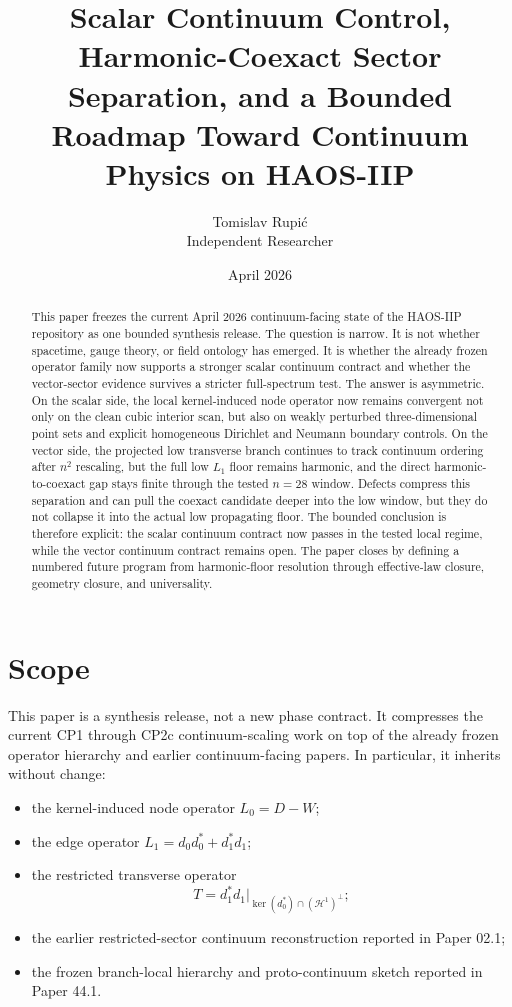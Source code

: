 \documentclass[11pt]{article}
\title{Scalar Continuum Control, Harmonic-Coexact Sector Separation, and a Bounded Roadmap Toward Continuum Physics on HAOS-IIP}
\author{Tomislav Rupi\'c \\ Independent Researcher}
\date{April 2026}
\begin{document}
\maketitle

\begin{abstract}
This paper freezes the current April 2026 continuum-facing state of the HAOS-IIP repository as one bounded synthesis release. The question is narrow. It is not whether spacetime, gauge theory, or field ontology has emerged. It is whether the already frozen operator family now supports a stronger scalar continuum contract and whether the vector-sector evidence survives a stricter full-spectrum test. The answer is asymmetric. On the scalar side, the local kernel-induced node operator now remains convergent not only on the clean cubic interior scan, but also on weakly perturbed three-dimensional point sets and explicit homogeneous Dirichlet and Neumann boundary controls. On the vector side, the projected low transverse branch continues to track continuum ordering after $n^2$ rescaling, but the full low $L_1$ floor remains harmonic, and the direct harmonic-to-coexact gap stays finite through the tested $n=28$ window. Defects compress this separation and can pull the coexact candidate deeper into the low window, but they do not collapse it into the actual low propagating floor. The bounded conclusion is therefore explicit: the scalar continuum contract now passes in the tested local regime, while the vector continuum contract remains open. The paper closes by defining a numbered future program from harmonic-floor resolution through effective-law closure, geometry closure, and universality.
\end{abstract}

\section{Scope}

This paper is a synthesis release, not a new phase contract. It compresses the current CP1 through CP2c continuum-scaling work on top of the already frozen operator hierarchy and earlier continuum-facing papers. In particular, it inherits without change:
\begin{itemize}
\item the kernel-induced node operator $L_0 = D-W$;
\item the edge operator $L_1 = d_0 d_0^* + d_1^* d_1$;
\item the restricted transverse operator
\[
T = d_1^* d_1 \big|_{\ker(d_0^*) \cap (\mathcal{H}^1)^\perp};
\]
\item the earlier restricted-sector continuum reconstruction reported in Paper 02.1;
\item the frozen branch-local hierarchy and proto-continuum sketch reported in Paper 44.1.
\end{itemize}
\end{document}
